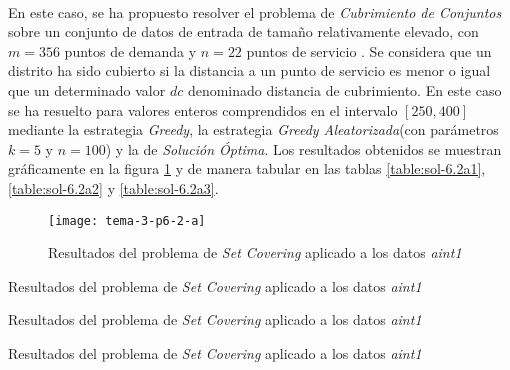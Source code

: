 \documentclass[spanish]{article}
\begin{document}
			\paragraph{}
			En este caso, se ha propuesto resolver el problema de \emph{Cubrimiento de Conjuntos} sobre un conjunto de datos de entrada de tamaño relativamente elevado, con $m = 356$ puntos de demanda y $n=22$ puntos de servicio . Se considera que un distrito ha sido cubierto si la distancia a un punto de servicio es menor o igual que un determinado valor $dc$ denominado distancia de cubrimiento. En este caso se ha resuelto para valores enteros comprendidos en el intervalo $[250, 400]$ mediante la estrategia \emph{Greedy}, la estrategia \emph{Greedy Aleatorizada}(con parámetros $k=5$ y $n=100$)  y la de \emph{Solución Óptima}. Los resultados obtenidos se muestran gráficamente en la figura \ref{fig:sol-6.2a} y de manera tabular en las tablas \ref{table:sol-6.2a1}, \ref{table:sol-6.2a2} y \ref{table:sol-6.2a3}.

			\begin{figure}[h]
				\begin{center}
					\texttt{[image: tema-3-p6-2-a]}
				\end{center}
				\caption{Resultados del problema de \emph{Set Covering} aplicado a los datos \emph{aint1}}
				\label{fig:sol-6.2a}
			\end{figure}

			\begin{table}[h]
				\begin{center}
				\end{center}
				\caption{Resultados del problema de \emph{Set Covering} aplicado a los datos \emph{aint1}}
				\label{table:sol-6.2a1}
			\end{table}

			\begin{table}[h]
				\begin{center}
				\end{center}
				\caption{Resultados del problema de \emph{Set Covering} aplicado a los datos \emph{aint1}}
				\label{table:sol-6.2a2}
			\end{table}

			\begin{table}[h]
				\begin{center}
				\end{center}
				\caption{Resultados del problema de \emph{Set Covering} aplicado a los datos \emph{aint1}}
				\label{table:sol-6.2a3}
			\end{table}
\end{document}
